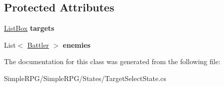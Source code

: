 \subsection*{Protected Attributes}
\begin{DoxyCompactItemize}
\item 
\hypertarget{class_simple_r_p_g_1_1_states_1_1_target_select_state_a83b2a454f571a185bfd77e453bc53c6f}{\hyperlink{class_simple_r_p_g_1_1_windows_1_1_list_box}{List\-Box} {\bfseries targets}}\label{class_simple_r_p_g_1_1_states_1_1_target_select_state_a83b2a454f571a185bfd77e453bc53c6f}

\item 
\hypertarget{class_simple_r_p_g_1_1_states_1_1_target_select_state_a9ecf5e51040139dddfc80fefa399fd96}{List$<$ \hyperlink{class_simple_r_p_g_1_1_battler}{Battler} $>$ {\bfseries enemies}}\label{class_simple_r_p_g_1_1_states_1_1_target_select_state_a9ecf5e51040139dddfc80fefa399fd96}

\end{DoxyCompactItemize}


The documentation for this class was generated from the following file\-:\begin{DoxyCompactItemize}
\item 
Simple\-R\-P\-G/\-Simple\-R\-P\-G/\-States/Target\-Select\-State.\-cs\end{DoxyCompactItemize}
